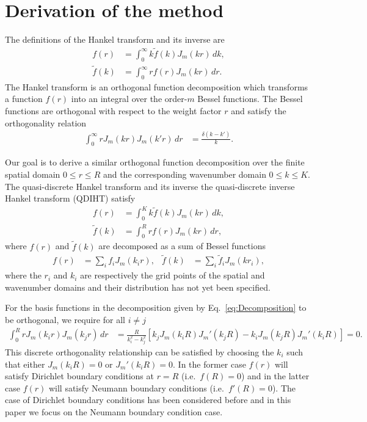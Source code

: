 \documentclass[aip,amsmath,amssymb,reprint,twocolumn]{revtex4-1}
\begin{document}
\section{Derivation of the method}
\label{sec:Derivation}

The definitions of the Hankel transform and its inverse are
\begin{align}
  f(r) &= \int_0^\infty k \tilde{f}(k) J_{m}(k r)\, dk, \\
  \tilde{f}(k) &= \int_0^\infty r f(r) J_{m}(k r)\, dr.
\end{align}
The Hankel transform is an orthogonal function decomposition which transforms a function $f(r)$ into an integral over the order-$m$ Bessel functions. The Bessel functions are orthogonal with respect to the weight factor $r$ and satisfy the orthogonality relation
\begin{align}
  \int_0^\infty r J_m(k r) J_m(k' r) \,dr &= \frac{\delta(k - k')}{k}.
\end{align}

Our goal is to derive a similar orthogonal function decomposition over the finite spatial domain $0 \leq r \leq R$ and the corresponding wavenumber domain $0 \leq k \leq K$.  The quasi-discrete Hankel transform and its inverse the quasi-discrete inverse Hankel transform (QDIHT) satisfy
\begin{align}
  f(r) &= \int_0^K k \tilde{f}(k) J_{m}(k r)\, dk,  \label{eq:QDHT}\\
  \tilde{f}(k) &= \int_0^R r f(r) J_{m}(k r)\, dr,  \label{eq:QDIHT}
\end{align}
where $f(r)$ and $\tilde{f}(k)$ are decomposed as a sum of Bessel functions
\begin{align}
  f(r) &= \sum_i f_i J_m(k_i r), & \tilde{f}(k) &= \sum_i \tilde{f}_i J_m(k r_i), \label{eq:Decomposition}
\end{align}
where the $r_i$ and $k_i$ are respectively the grid points of the spatial and wavenumber domains and their distribution has not yet been specified.

\begin{widetext}
For the basis functions in the decomposition given by Eq.~\eqref{eq:Decomposition} to be orthogonal, we require for all $i \neq j$
\begin{align}
  \int_0^{R} r J_m(k_i r) J_m(k_j r)\, dr &= \frac{R}{k_i^2-k_j^2} \left[k_j J_m(k_i R) J_m'(k_j R) - k_i J_m(k_j R) J_m'(k_i R)\right] = 0. \label{eq:DiscreteOrthogonality}
\end{align}
This discrete orthogonality relationship can be satisfied by choosing the $k_i$ such that either $J_m(k_i R) = 0$ or $J_m'(k_i R) = 0$.  In the former case $f(r)$ will satisfy Dirichlet boundary conditions at $r=R$ (i.e.\ $f(R) = 0$) and in the latter case $f(r)$ will satisfy Neumann boundary conditions (i.e.\ $f'(R) = 0$).  The case of Dirichlet boundary conditions has been considered before \citep{Yu:1998,Guizar-Sicairos:2004} and in this paper we focus on the Neumann boundary condition case.
\end{widetext}
\end{document}
